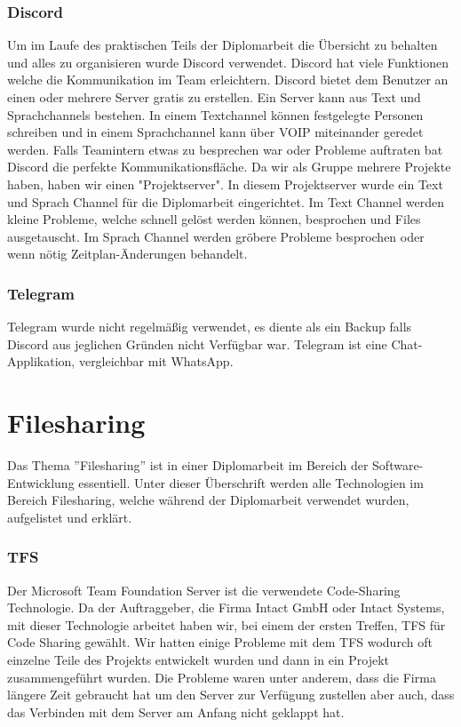 \subsubsection {Discord}
\label{sec:Discord}
Um im Laufe des praktischen Teils der Diplomarbeit die Übersicht zu behalten und alles zu organisieren wurde Discord verwendet. Discord hat viele Funktionen welche die Kommunikation im Team erleichtern. Discord bietet dem Benutzer an einen oder mehrere Server gratis zu erstellen. Ein Server kann aus Text und Sprachchannels bestehen. In einem Textchannel können festgelegte Personen schreiben und in einem Sprachchannel kann über VOIP miteinander geredet werden. Falls Teamintern etwas zu besprechen war oder Probleme auftraten bat Discord die perfekte Kommunikationsfläche. Da wir als Gruppe mehrere Projekte haben, haben wir einen "Projektserver". In diesem Projektserver wurde ein Text und Sprach Channel für die Diplomarbeit eingerichtet. Im Text Channel werden kleine Probleme, welche schnell gelöst werden können, besprochen und Files ausgetauscht. Im Sprach Channel werden gröbere Probleme besprochen oder wenn nötig Zeitplan-Änderungen behandelt. 
\subsubsection {Telegram}
\label{sec:Telegram}
Telegram wurde nicht regelmäßig verwendet, es diente als ein Backup falls Discord aus jeglichen Gründen nicht Verfügbar war. Telegram ist eine Chat-Applikation, vergleichbar mit WhatsApp. 
\section{Filesharing}
\label{sec:Filesharing}
Das Thema ''Filesharing'' ist in einer Diplomarbeit im Bereich der Software-Entwicklung essentiell. Unter dieser Überschrift werden alle Technologien im Bereich Filesharing, welche während der Diplomarbeit verwendet wurden, aufgelistet und erklärt. 
\subsubsection {TFS}
\label{sec:TFS}
Der Microsoft Team Foundation Server ist die verwendete Code-Sharing Technologie. Da der Auftraggeber, die Firma Intact GmbH oder Intact Systems, mit dieser Technologie arbeitet haben wir, bei einem der ersten Treffen, TFS für Code Sharing gewählt. Wir hatten einige Probleme mit dem TFS wodurch oft einzelne Teile des Projekts entwickelt wurden und dann in ein Projekt zusammengeführt wurden. Die Probleme waren unter anderem, dass die Firma längere Zeit gebraucht hat um den Server zur Verfügung zustellen aber auch, dass das Verbinden mit dem Server am Anfang nicht geklappt hat. 
%
